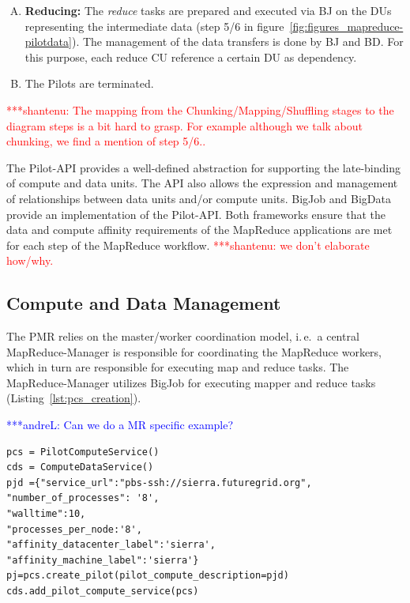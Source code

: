 \documentclass{acm_proc_article-sp}
\newcommand{\jhanote}[1]{ {\textcolor{red} { ***shantenu: #1 }}}
\newcommand{\alnote}[1]{ {\textcolor{blue} { ***andreL: #1 }}}
\newcommand{\alnote}[1]{}
\newcommand{\jhanote}[1]{}
\newcommand{\pilots}{Pilots\xspace}
\begin{document}
\begin{enumerate}[A.]
	
\item \textbf{Reducing:} The {\it reduce} tasks are prepared and
  executed via BJ on the DUs representing the intermediate data (step
  5/6 in figure~\ref{fig:figures_mapreduce-pilotdata}).  The
  management of the data transfers is done by BJ and BD. For this
  purpose, each reduce CU reference a certain DU as dependency.
	
	\item The \pilots are terminated.

\end{enumerate}

\jhanote{The mapping from the Chunking/Mapping/Shuffling stages to the
  diagram steps is a bit hard to grasp. For example although we talk
  about chunking, we find a mention of step 5/6..}

The Pilot-API provides a well-defined abstraction for supporting the
late-binding of compute and data units. The API also allows the
expression and management of relationships between data units and/or
compute units. BigJob and BigData provide an implementation of the
Pilot-API. Both frameworks ensure that the data and compute affinity
requirements of the MapReduce applications are met for each step of
the MapReduce workflow. \jhanote{we don't elaborate how/why.}

\subsection{Compute and Data Management}
The PMR relies on the master/worker coordination model, i.\,e.\ a
central MapReduce-Manager is responsible for coordinating the
MapReduce workers, which in turn are responsible for executing map and
reduce tasks. The MapReduce-Manager utilizes BigJob for executing
mapper and reduce tasks (Listing~\ref{lst:pcs_creation}).

\alnote{Can we do a MR specific example?}

\lstset{
language=Python,
frame=single,
captionpos=b,
stringstyle=\ttfamily,
basicstyle=\scriptsize\ttfamily
}
\noindent\begin{minipage}{0.47 \textwidth}
\begin{lstlisting}[caption={\textbf{Pilot Compute Creation:} Instantiation of a Pilot Job using Pilot Compute Description}, label={lst:pcs_creation}]
pcs = PilotComputeService()
cds = ComputeDataService()
pjd ={"service_url":"pbs-ssh://sierra.futuregrid.org", 
"number_of_processes": '8',
"walltime":10, 
"processes_per_node:'8',
"affinity_datacenter_label":'sierra',
"affinity_machine_label":'sierra'}
pj=pcs.create_pilot(pilot_compute_description=pjd)
cds.add_pilot_compute_service(pcs)
\end{lstlisting}
\end{minipage}
\end{document}
